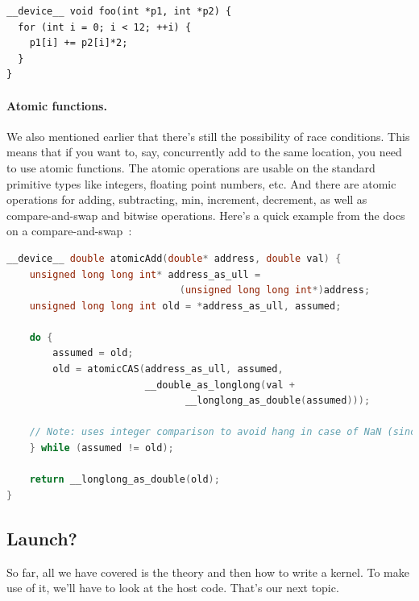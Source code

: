 \documentclass[a4paper]{report}
\begin{document}
{\scriptsize \hspace*{2em} \begin{minipage}{.5\textwidth}
    \begin{lstlisting}
__device__ void foo(int *p1, int *p2) {
  for (int i = 0; i < 12; ++i) {
    p1[i] += p2[i]*2;
  }
}
    \end{lstlisting}
\end{minipage} }

\paragraph{Atomic functions.}

We also mentioned earlier that there's still the possibility of race conditions. This means that if you want to, say, concurrently add to the same location, you need to use atomic functions. The atomic operations are usable on the standard primitive types like integers, floating point numbers, etc. And there are atomic operations for adding, subtracting, min, increment, decrement, as well as compare-and-swap and bitwise operations. Here's a quick example from the docs on a compare-and-swap~\cite{cuda}:

\begin{lstlisting}[language=C++]
__device__ double atomicAdd(double* address, double val) {
    unsigned long long int* address_as_ull =
                              (unsigned long long int*)address;
    unsigned long long int old = *address_as_ull, assumed;

    do {
        assumed = old;
        old = atomicCAS(address_as_ull, assumed,
                        __double_as_longlong(val +
                               __longlong_as_double(assumed)));

    // Note: uses integer comparison to avoid hang in case of NaN (since NaN != NaN)
    } while (assumed != old);

    return __longlong_as_double(old);
}
\end{lstlisting}

\subsection*{Launch?}

So far, all we have covered is the theory and then how to write a kernel. To make use of it, we'll have to look at the host code. That's our next topic. 
\end{document}
